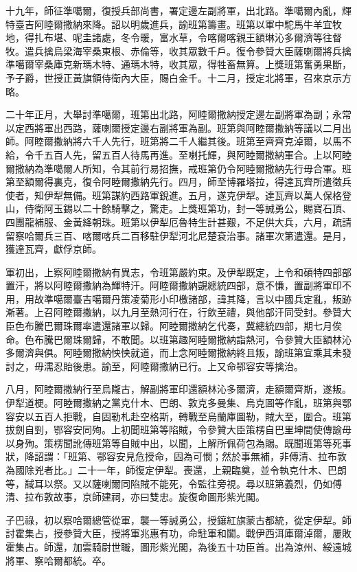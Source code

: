 \begin{pinyinscope}
十九年，師征準噶爾，復授兵部尚書，署定邊左副將軍，出北路。準噶爾內亂，輝特臺吉阿睦爾撒納來降。詔以明歲進兵，諭班第籌畫。班第以軍中駝馬牛羊宜牧地，得扎布堪、呢圭諸處，冬令暖，富水草，令喀爾喀親王額琳沁多爾濟等往督牧。遣兵擒烏梁海宰桑東根、赤倫等，收其眾數千戶。復令參贊大臣薩喇爾將兵擒準噶爾宰桑庫克新瑪木特、通瑪木特，收其眾，得牲畜無算。上獎班第奮勇果斷，予子爵，世授正黃旗領侍衛內大臣，賜白金千。十二月，授定北將軍，召來京示方略。

二十年正月，大舉討準噶爾，班第出北路，阿睦爾撒納授定邊左副將軍為副；永常以定西將軍出西路，薩喇爾授定邊右副將軍為副。班第與阿睦爾撒納等議以二月出師。阿睦爾撒納將六千人先行，班第將二千人繼其後。班第至齊齊克淖爾，以馬不給，令千五百人先，留五百人待馬再進。至喇托輝，與阿睦爾撒納軍合。上以阿睦爾撒納為準噶爾人所知，令其前行易招撫，戒班第仍令阿睦爾撒納先行毋合軍。班第至額爾得裏克，復令阿睦爾撒納先行。四月，師至博羅塔拉，得達瓦齊所遣徵兵使者，知伊犁無備。班第謀約西路軍銳進。五月，遂克伊犁。達瓦齊以萬人保格登山，侍衛阿玉錫以二十餘騎擊之，驚走。上獎班第功，封一等誠勇公，賜寶石頂、四團龍補服、金黃絳朝珠。班第以伊犁厄魯特生計甚艱，不足供大兵，六月，疏請留察哈爾兵三百、喀爾喀兵二百移駐伊犁河北尼楚袞治事。諸軍次第遣還。是月，獲達瓦齊，獻俘京師。

軍初出，上察阿睦爾撒納有異志，令班第嚴約束。及伊犁既定，上令和碩特四部部置汗，將以阿睦爾撒納為輝特汗。阿睦爾撒納覬總統四部，意不慊，置副將軍印不用，用故準噶爾臺吉噶爾丹策凌菊形小印檄諸部，諱其降，言以中國兵定亂，叛跡漸著。上召阿睦爾撒納，以九月至熱河行在，行飲至禮，與他部汗同受封。參贊大臣色布騰巴爾珠爾率遣還諸軍以歸。阿睦爾撒納乞代奏，冀總統四部，期七月俟命。色布騰巴爾珠爾歸，不敢聞。以班第趣阿睦爾撒納詣熱河，令參贊大臣額林沁多爾濟與俱。阿睦爾撒納怏怏就道，而上念阿睦爾撒納終且叛，諭班第宜乘其未發討之，毋濡忍貽後患。諭至，阿睦爾撒納已行。上又命鄂容安等擒治。

八月，阿睦爾撒納行至烏隴古，解副將軍印還額林沁多爾濟，走額爾齊斯，遂叛。伊犁道梗。阿睦爾撒納之黨克什木、巴朗、敦克多曼集、烏克圖等作亂，班第與鄂容安以五百人拒戰，自固勒札赴空格斯，轉戰至烏蘭庫圖勒，賊大至，圍合。班第拔劍自剄，鄂容安同殉。上初聞班第等陷賊，令參贊大臣策楞自巴里坤間使傳諭毋以身殉。策楞聞訛傳班第等自賊中出，以聞，上解所佩荷包為賜。既聞班第等死事狀，降詔謂：「班第、鄂容安見危授命，固為可憫；然於事無補，非傅清、拉布敦為國除兇者比。」二十一年，師復定伊犁。喪還，上親臨奠，並令執克什木、巴朗等，馘耳以祭。又以薩喇爾同陷賊不能死，令監往旁視。尋以班第義烈，仍如傅清、拉布敦故事，京師建祠，亦曰雙忠。旋復命圖形紫光閣。

子巴祿，初以察哈爾總管從軍，襲一等誠勇公，授鑲紅旗蒙古都統，從定伊犁。師討霍集占，授參贊大臣，授將軍兆惠有功，命駐軍和闐。戰伊西洱庫爾淖爾，屢敗霍集占。師還，加雲騎尉世職，圖形紫光閣，為後五十功臣首。出為涼州、綏遠城將軍、察哈爾都統。卒。


\end{pinyinscope}
